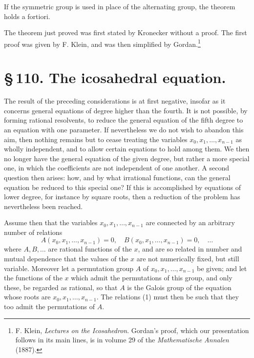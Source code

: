 \documentclass[11pt]{article}
\begin{document}
If the symmetric group is used in place of the alternating group, the theorem holds a fortiori.

The theorem just proved was first stated by Kronecker without a proof. The first proof was given by F. Klein, and was then simplified by Gordan.\footnote{F. Klein, \emph{Lectures on the Icosahedron}. Gordan's proof, which our presentation follows in its main lines, is in volume 29 of the \emph{Mathematische Annalen} (1887).}

\section*{\S\,110. The icosahedral equation.}

The result of the preceding considerations is at first negative, insofar as it concerns general equations of degree higher than the fourth. It is not possible, by forming rational resolvents, to reduce the general equation of the fifth degree to an equation with one parameter. If nevertheless we do not wish to abandon this aim, then nothing remains but to cease treating the variables \(x_0,x_1,\ldots,x_{n-1}\) as wholly independent, and to allow certain equations to hold among them. We then no longer have the general equation of the given degree, but rather a more special one, in which the coefficients are not independent of one another. A second question then arises: how, and by what irrational functions, can the general equation be reduced to this special one? If this is accomplished by equations of lower degree, for instance by square roots, then a reduction of the problem has nevertheless been reached.

Assume then that the variables \(x_0,x_1,\ldots,x_{n-1}\) are connected by an arbitrary number of relations
\begin{equation}
A(x_0,x_1,\ldots,x_{n-1})=0,\quad
B(x_0,x_1,\ldots,x_{n-1})=0,\quad\ldots
\tag{1}
\end{equation}
where \(A,B,\ldots\) are rational functions of the \(x\), and are so related in number and mutual dependence that the values of the \(x\) are not numerically fixed, but still variable. Moreover let a permutation group \(A\) of \(x_0,x_1,\ldots,x_{n-1}\) be given; and let the functions of the \(x\) which admit the permutations of this group, and only these, be regarded as rational, so that \(A\) is the Galois group of the equation whose roots are \(x_0,x_1,\ldots,x_{n-1}\). The relations (1) must then be such that they too admit the permutations of \(A\).
\end{document}
